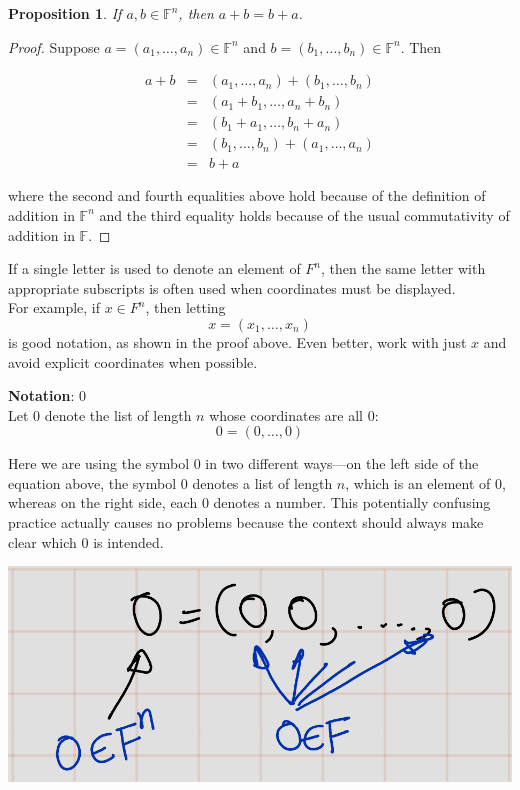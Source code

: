 \documentclass[
]{book}
\newtheorem{proposition}{Proposition}[chapter]
\theoremstyle{definition}
\theoremstyle{definition}
\theoremstyle{definition}
\theoremstyle{definition}
\theoremstyle{remark}
\begin{document}
\begin{proposition}
\protect\hypertarget{prp:unnamed-chunk-12}{}\label{prp:unnamed-chunk-12}If \(a, b \in \mathbb{F}^n\), then \(a+b=b+a\).
\end{proposition}

\begin{proof}
Suppose \(a = (a_1, …, a_n) \in \mathbb{F}^n\) and \(b = (b_1, …, b_n) \in \mathbb{F}^n\). Then

\begin{eqnarray}
a+b
&=& (a_1,…,a_n) + (b_1,…,b_n)\\
&=& (a_1 + b_1, …, a_n + b_n)\\
&=& (b_1 + a_1, …, b_n + a_n)\\
&=& (b_1,…,b_n) + (a_1,…,a_n)\\
&=& b+a
\end{eqnarray}

where the second and fourth equalities above hold because of the definition of addition in \(\mathbb{F}^n\) and the third equality holds because of the usual commutativity of addition in \(\mathbb{F}\).
\end{proof}

If a single letter is used to denote an element of \(F^n\), then the same letter with appropriate subscripts is often used when coordinates must be displayed.\\
For example, if \(x \in F^n\), then letting \[x=(x_1, \ldots, x_n)\] is good notation, as shown in the proof above. Even better, work with just \(x\) and avoid explicit coordinates when possible.

\textbf{Notation}: \(0\)\\
Let \(0\) denote the list of length \(n\) whose coordinates are all \(0\):
\[ 0 = (0, \ldots, 0) \]

Here we are using the symbol \(0\) in two different ways---on the left side of the equation above, the symbol \(0\) denotes a list of length \(n\), which is an element of \(0\), whereas on the right side, each \(0\) denotes a number. This potentially confusing practice actually causes no problems because the context should always make clear which \(0\) is intended.

\includegraphics{fig/Chapter-1/fig1.png}
\end{document}
